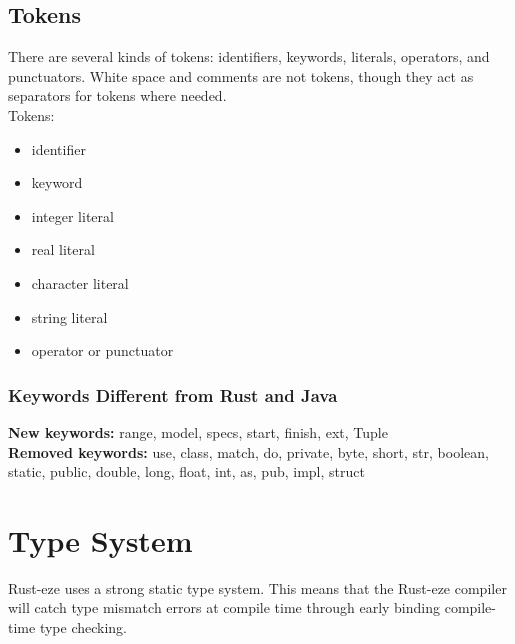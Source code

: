 \documentclass[letterpaper, 10pt, DIV=13]{scrartcl}
\numberwithin{equation}{section}
\numberwithin{figure}{section}
\numberwithin{table}{section}
\begin{document}
\subsection{Tokens}
There are several kinds of tokens: identifiers, keywords, literals, operators, 
and punctuators. White space and comments are not tokens, though they act as
separators for tokens where needed. \\
Tokens:
\begin{itemize}
    \item identifier
    \item keyword
    \item integer literal
    \item real literal
    \item character literal
    \item string literal
    \item operator or punctuator
\end{itemize}

\subsubsection{Keywords Different from Rust and Java}
\textbf{New keywords:} range, model, specs, start, finish, ext, Tuple \\
\textbf{Removed keywords:} use, class, match, do, private, byte, short, str,
                           boolean, static, public, double, long, float,
                           int, as, pub, impl, struct \\

\section{Type System}
Rust-eze uses a strong static type system. This means that the Rust-eze compiler
will catch type mismatch errors at compile time through early binding compile-time
type checking.
\end{document}
